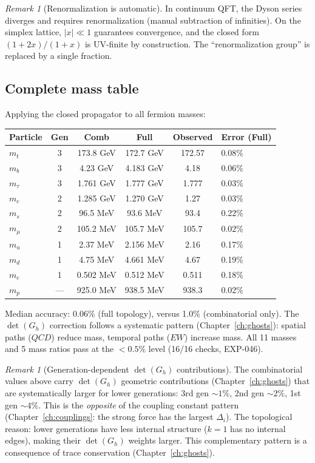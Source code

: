 \documentclass[12pt]{article}
\theoremstyle{remark}
\newtheorem{remark}[theorem]{Remark}
\theoremstyle{definition}
\begin{document}
\begin{remark}[Renormalization is automatic]
In continuum QFT, the Dyson series diverges and requires renormalization (manual subtraction of infinities).  On the simplex lattice, $|x| \ll 1$ guarantees convergence, and the closed form $(1+2x)/(1+x)$ is UV-finite by construction.  The ``renormalization group'' is replaced by a single fraction.
\end{remark}

\subsection{Complete mass table}

Applying the closed propagator to all fermion masses:

\begin{center}
\begin{tabular}{lccccl}
\hline
Particle & Gen & Comb & Full & Observed & Error (Full) \\
\hline
$m_t$ & 3 & 173.8 GeV & 172.7 GeV & 172.57 & 0.08\% \\
$m_b$ & 3 & 4.23 GeV & 4.183 GeV & 4.18 & 0.06\% \\
$m_\tau$ & 3 & 1.761 GeV & 1.777 GeV & 1.777 & 0.03\% \\
\hline
$m_c$ & 2 & 1.285 GeV & 1.270 GeV & 1.27 & 0.03\% \\
$m_s$ & 2 & 96.5 MeV & 93.6 MeV & 93.4 & 0.22\% \\
$m_\mu$ & 2 & 105.2 MeV & 105.7 MeV & 105.7 & 0.02\% \\
\hline
$m_u$ & 1 & 2.37 MeV & 2.156 MeV & 2.16 & 0.17\% \\
$m_d$ & 1 & 4.75 MeV & 4.661 MeV & 4.67 & 0.19\% \\
$m_e$ & 1 & 0.502 MeV & 0.512 MeV & 0.511 & 0.18\% \\
\hline
$m_p$ & --- & 925.0 MeV & 938.5 MeV & 938.3 & 0.02\% \\
\hline
\end{tabular}
\end{center}

Median accuracy: 0.06\% (full topology), versus 1.0\% (combinatorial only).  The $\det(G_h)$ correction follows a systematic pattern (Chapter~\ref{ch:ghosts}): spatial paths ($QCD$) reduce mass, temporal paths ($EW$) increase mass.  All 11 masses and 5 mass ratios pass at the $< 0.5\%$ level (16/16 checks, EXP-046).

\begin{remark}[Generation-dependent $\det(G_h)$ contributions]
The combinatorial values above carry $\det(G_h)$ geometric contributions (Chapter~\ref{ch:ghosts}) that are systematically larger for lower generations: 3rd gen $\sim 1\%$, 2nd gen $\sim 2\%$, 1st gen $\sim 4\%$. This is the \emph{opposite} of the coupling constant pattern (Chapter~\ref{ch:couplings}: the strong force has the largest $\Delta_i$). The topological reason: lower generations have less internal structure ($k = 1$ has no internal edges), making their $\det(G_h)$ weights larger. This complementary pattern is a consequence of trace conservation (Chapter~\ref{ch:ghosts}).
\end{remark}
\end{document}
